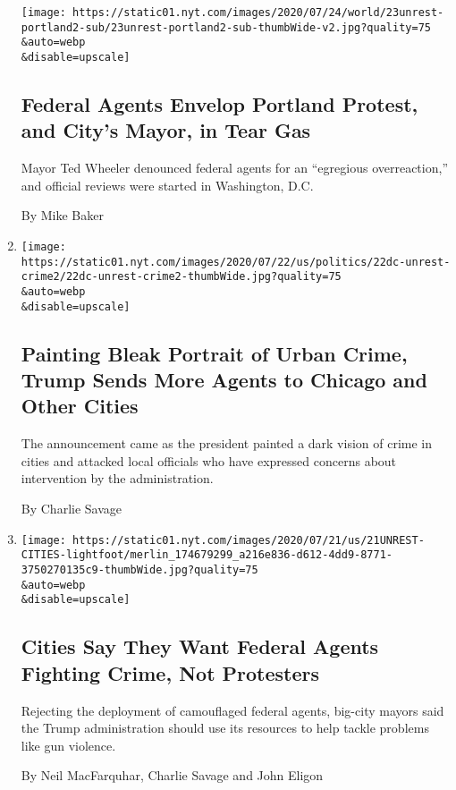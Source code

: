 \begin{enumerate}
  \texttt{[image: https://static01.nyt.com/images/2020/07/24/world/23unrest-portland2-sub/23unrest-portland2-sub-thumbWide-v2.jpg?quality=75\\\&auto=webp\\\&disable=upscale]}

  \hypertarget{federal-agents-envelop-portland-protest-and-citys-mayor-in-tear-gas}{%
  \subsection{Federal Agents Envelop Portland Protest, and City's Mayor,
  in Tear
  Gas}\label{federal-agents-envelop-portland-protest-and-citys-mayor-in-tear-gas}}

  Mayor Ted Wheeler denounced federal agents for an ``egregious
  overreaction,'' and official reviews were started in Washington, D.C.

  By Mike Baker
\item
  \href{/2020/07/22/us/politics/trump-federal-agents-cities.html}{}

  \texttt{[image: https://static01.nyt.com/images/2020/07/22/us/politics/22dc-unrest-crime2/22dc-unrest-crime2-thumbWide.jpg?quality=75\\\&auto=webp\\\&disable=upscale]}

  \hypertarget{painting-bleak-portrait-of-urban-crime-trump-sends-more-agents-to-chicago-and-other-cities}{%
  \subsection{Painting Bleak Portrait of Urban Crime, Trump Sends More
  Agents to Chicago and Other
  Cities}\label{painting-bleak-portrait-of-urban-crime-trump-sends-more-agents-to-chicago-and-other-cities}}

  The announcement came as the president painted a dark vision of crime
  in cities and attacked local officials who have expressed concerns
  about intervention by the administration.

  By Charlie Savage
\item
  \href{/2020/07/21/us/trump-federal-agents-chicago.html}{}

  \texttt{[image: https://static01.nyt.com/images/2020/07/21/us/21UNREST-CITIES-lightfoot/merlin\_174679299\_a216e836-d612-4dd9-8771-3750270135c9-thumbWide.jpg?quality=75\\\&auto=webp\\\&disable=upscale]}

  \hypertarget{cities-say-they-want-federal-agents-fighting-crime-not-protesters}{%
  \subsection{Cities Say They Want Federal Agents Fighting Crime, Not
  Protesters}\label{cities-say-they-want-federal-agents-fighting-crime-not-protesters}}

  Rejecting the deployment of camouflaged federal agents, big-city
  mayors said the Trump administration should use its resources to help
  tackle problems like gun violence.

  By Neil MacFarquhar, Charlie Savage and John Eligon
\end{enumerate}


